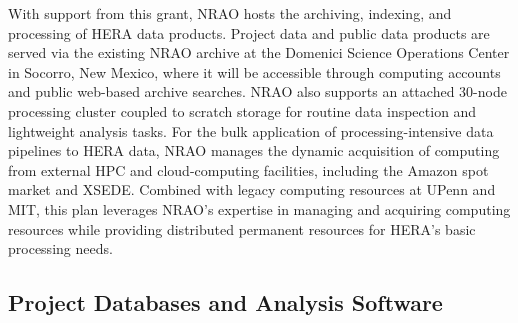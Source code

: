 \documentclass[preprint,11pt]{aastex}
\begin{document}
With support from this grant, NRAO hosts the archiving, indexing, and processing of HERA data products. 
Project data and public data products are served via the existing 
NRAO archive at the Domenici Science Operations Center %
in Socorro, New Mexico, where it will be accessible through computing accounts and public web-based
archive searches.
NRAO also supports
an attached 30-node processing cluster 
coupled to 
scratch storage
for routine data inspection and lightweight analysis tasks.
For the bulk application of processing-intensive data pipelines to HERA data,
NRAO manages the dynamic acquisition of computing from
external HPC and cloud-computing facilities, including the Amazon spot market and XSEDE. 
Combined with legacy computing resources at UPenn and MIT, this plan leverages NRAO's
expertise in managing and acquiring computing resources while providing distributed
permanent resources for HERA's basic processing needs.





\vspace{-20pt}
\subsection{Project Databases and Analysis Software} 
\label{sec:software}
\vspace{-5pt}
\end{document}
